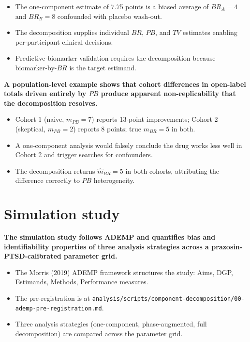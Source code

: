 \documentclass[
  11pt,
]{article}
\begin{document}
\begin{itemize}\setlength{\itemsep}{2pt}\setlength{\parskip}{0pt}
\item The one-component estimate of 7.75 points is a biased average of $BR_A = 4$ and $BR_B = 8$ confounded with placebo wash-out.
\item The decomposition supplies individual $BR$, $PB$, and $TV$ estimates enabling per-participant clinical decisions.
\item Predictive-biomarker validation requires the decomposition because biomarker-by-$BR$ is the target estimand.
\end{itemize}

\textbf{A population-level example shows that cohort differences in open-label totals driven entirely by $PB$ produce apparent non-replicability that the decomposition resolves.}

\begin{itemize}\setlength{\itemsep}{2pt}\setlength{\parskip}{0pt}
\item Cohort 1 (naive, $m_{PB} = 7$) reports 13-point improvements; Cohort 2 (skeptical, $m_{PB} = 2$) reports 8 points; true $m_{BR} = 5$ in both.
\item A one-component analysis would falsely conclude the drug works less well in Cohort 2 and trigger searches for confounders.
\item The decomposition returns $\hat{m}_{BR} = 5$ in both cohorts, attributing the difference correctly to $PB$ heterogeneity.
\end{itemize}

\section{Simulation study}\label{simulation-study}

\textbf{The simulation study follows ADEMP and quantifies bias and identifiability properties of three analysis strategies across a prazosin-PTSD-calibrated parameter grid.}

\begin{itemize}\setlength{\itemsep}{2pt}\setlength{\parskip}{0pt}
\item The Morris (2019) ADEMP framework structures the study: Aims, DGP, Estimands, Methods, Performance measures.
\item The pre-registration is at \texttt{analysis/scripts/component-decomposition/00-ademp-pre-registration.md}.
\item Three analysis strategies (one-component, phase-augmented, full decomposition) are compared across the parameter grid.
\end{itemize}
\end{document}
